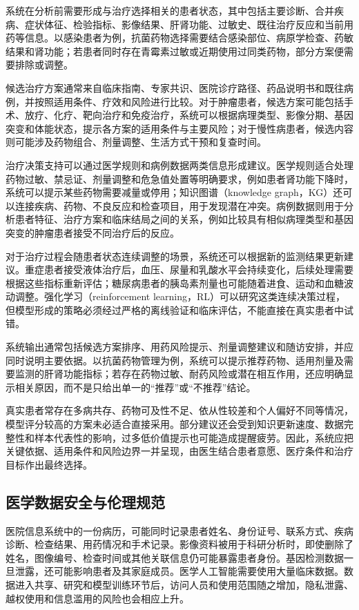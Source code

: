 系统在分析前需要形成与治疗选择相关的患者状态，其中包括主要诊断、合并疾病、症状体征、检验指标、影像结果、肝肾功能、过敏史、既往治疗反应和当前用药等信息。以感染患者为例，抗菌药物选择需要结合感染部位、病原学检查、药敏结果和肾功能；若患者同时存在青霉素过敏或近期使用过同类药物，部分方案便需要排除或调整。

候选治疗方案通常来自临床指南、专家共识、医院诊疗路径、药品说明书和既往病例，并按照适用条件、疗效和风险进行比较。对于肿瘤患者，候选方案可能包括手术、放疗、化疗、靶向治疗和免疫治疗，系统可以根据病理类型、影像分期、基因突变和体能状态，提示各方案的适用条件与主要风险；对于慢性病患者，候选内容则可能涉及药物组合、剂量调整、生活方式干预和复查时间。

治疗决策支持可以通过医学规则和病例数据两类信息形成建议。医学规则适合处理药物过敏、禁忌证、剂量调整和危急值处置等明确要求，例如患者肾功能下降时，系统可以提示某些药物需要减量或停用；知识图谱（knowledge graph，KG）还可以连接疾病、药物、不良反应和检查项目，用于发现潜在冲突。病例数据则用于分析患者特征、治疗方案和临床结局之间的关系，例如比较具有相似病理类型和基因突变的肿瘤患者接受不同治疗后的反应。

对于治疗过程会随患者状态连续调整的场景，系统还可以根据新的监测结果更新建议。重症患者接受液体治疗后，血压、尿量和乳酸水平会持续变化，后续处理需要根据这些指标重新评估；糖尿病患者的胰岛素剂量也可能随着进食、运动和血糖波动调整。强化学习（reinforcement learning，RL）可以研究这类连续决策过程，但模型形成的策略必须经过严格的离线验证和临床评估，不能直接在真实患者中试错。

系统输出通常包括候选方案排序、用药风险提示、剂量调整建议和随访安排，并应同时说明主要依据。以抗菌药物管理为例，系统可以提示推荐药物、适用剂量及需要监测的肝肾功能指标；若存在药物过敏、耐药风险或潜在相互作用，还应明确显示相关原因，而不是只给出单一的“推荐”或“不推荐”结论。

真实患者常存在多病共存、药物可及性不足、依从性较差和个人偏好不同等情况，模型评分较高的方案未必适合直接采用。部分建议还会受到知识更新速度、数据完整性和样本代表性的影响，过多低价值提示也可能造成提醒疲劳。因此，系统应把关键依据、适用条件和风险边界一并呈现，由医生结合患者意愿、医疗条件和治疗目标作出最终选择。

\subsection{医学数据安全与伦理规范}

医院信息系统中的一份病历，可能同时记录患者姓名、身份证号、联系方式、疾病诊断、检查结果、用药情况和手术记录。影像资料被用于科研分析时，即使删除了姓名，图像编号、检查时间或其他关联信息仍可能暴露患者身份。基因检测数据一旦泄露，还可能影响患者及其家庭成员。医学人工智能需要使用大量临床数据。数据进入共享、研究和模型训练环节后，访问人员和使用范围随之增加，隐私泄露、越权使用和信息滥用的风险也会相应上升。

